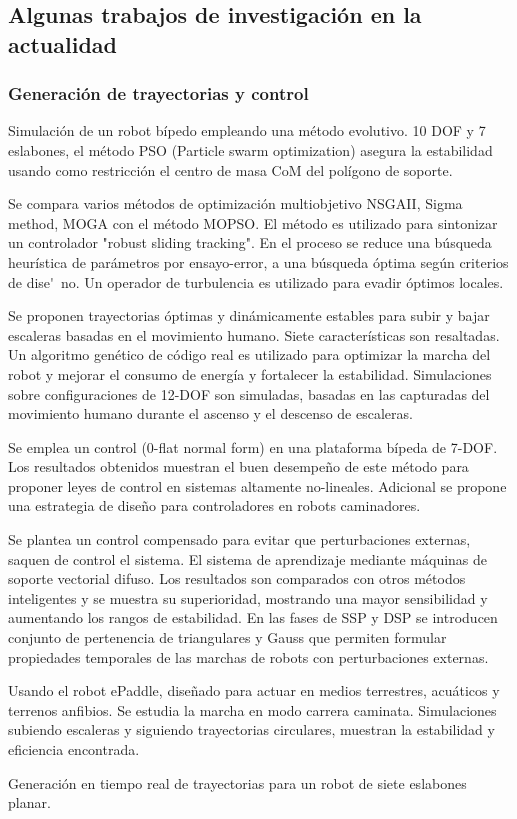 \documentclass[12pt,twoside,onecolumn,letterpaper]{article}
\begin{document}
\subsection{Algunas trabajos de investigaci\'on en la actualidad }
\label{sec:algtra}

\subsubsection{Generaci\'on de trayectorias y control}
\label{sec:gentray}
Simulaci\'on de un robot b\'ipedo empleando una m\'etodo evolutivo. 10 DOF y 7 eslabones, el m\'etodo PSO (Particle swarm optimization) asegura la estabilidad usando como restricci\'on el centro de masa CoM del pol\'igono de soporte\cite{Kherici2014}.\par
Se compara varios m\'etodos de optimizaci\'on multiobjetivo NSGAII, Sigma method, MOGA con el m\'etodo MOPSO. El m\'etodo es utilizado para sintonizar un controlador "robust sliding tracking". En el proceso se reduce una b\'usqueda heur\'istica de parámetros por ensayo-error, a una b\'usqueda \'optima seg\'un criterios de dise\'~no. Un operador de turbulencia es utilizado para evadir \'optimos locales\cite{Mahmoodabadi2014}.\par
Se proponen trayectorias \'optimas y din\'amicamente estables para subir y bajar escaleras basadas en el movimiento humano. Siete caracter\'isticas son resaltadas. Un algoritmo gen\'etico de c\'odigo real es utilizado para optimizar la marcha del robot y mejorar el consumo de energ\'ia y fortalecer la estabilidad. Simulaciones sobre configuraciones de 12-DOF son simuladas, basadas en las capturadas del movimiento humano durante el ascenso y el descenso de escaleras\cite{Lim2014}.\par
Se emplea un control (0-flat normal form) en una plataforma b\'ipeda de 7-DOF. Los resultados obtenidos muestran el buen desempe\~no de este m\'etodo para proponer leyes de control en sistemas altamente no-lineales. Adicional se propone una estrategia de dise\~no para controladores en robots caminadores\cite{Bououden2014}.\par
Se plantea un control compensado para evitar que perturbaciones externas, saquen de control el sistema. El sistema de aprendizaje mediante m\'aquinas de soporte vectorial difuso. Los resultados son comparados con otros m\'etodos inteligentes y se muestra su superioridad, mostrando una mayor sensibilidad y aumentando los rangos de estabilidad. En las fases de SSP y DSP se introducen conjunto de pertenencia de  triangulares y Gauss que permiten formular propiedades temporales de las marchas de robots con perturbaciones externas\cite{Wang2013}.\par
Usando el robot ePaddle, dise\~nado para actuar en medios terrestres, acu\'aticos y terrenos anfibios. Se estudia la marcha en modo carrera caminata. Simulaciones subiendo escaleras y siguiendo trayectorias circulares, muestran la estabilidad y eficiencia encontrada\cite{Sun2013}.\par
Generaci\'on en tiempo real de trayectorias para un robot de siete eslabones planar\cite{Farzaneh2014}.\par
\end{document}
